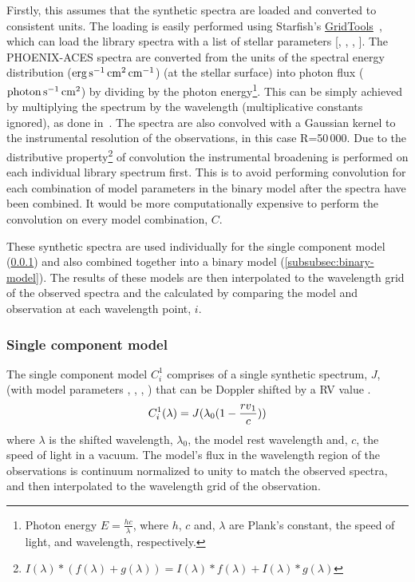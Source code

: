 Firstly, this assumes that the synthetic spectra are loaded and converted to consistent units.
The loading is easily performed using Starfish's \href{https://iancze.github.io/Starfish/current/grid_tools.html}{GridTools}~\citep{czekala_constructing_2015}, which can load the library spectra with a list of stellar parameters [\Teff{}, \Logg{}, \feh{}, \alphafe{}].
The {PHOENIX-ACES} spectra are converted from the units of the spectral energy distribution (\(\rm erg\,s^{-1}\,cm^{2}\,cm^{-1}\)) (at the stellar surface) into photon flux (\(\rm photon\,s^{-1}\,cm^{2}\)) by dividing by the photon energy\footnote{Photon energy \(E=\frac{hc}{\lambda}\), where \(h\), \(c\) and, \(\lambda\) are Plank's constant, the speed of light, and wavelength, respectively.}.
This can be simply achieved by multiplying the spectrum by the wavelength (multiplicative constants ignored), as done in~\citet{figueira_radial_2016}.
The spectra are also convolved with a Gaussian kernel to the instrumental resolution of the observations, in this case R=50\,000.
Due to the distributive property\footnote{\(I(\lambda) \ast (f(\lambda) + g(\lambda)) = I(\lambda) \ast f(\lambda) + I(\lambda) \ast g(\lambda) \)} of convolution the instrumental broadening is performed on each individual library spectrum first.
This is to avoid performing convolution for each combination of model parameters in the binary model after the spectra have been combined.
It would be more computationally expensive to perform the convolution on every model combination, \(C\).

These synthetic spectra are used individually for the single component model (\cref{subsubsec:single-model}) and also combined together into a binary model (\cref{subsubsec:binary-model}).
The results of these models are then interpolated to the wavelength grid of the observed spectra and the \textchisquared{} calculated by comparing the model and observation at each wavelength point, \(i\).

\subsubsection{Single component model}
\label{subsubsec:single-model}
The single component model \(C^{1}_{i}\) comprises of a single synthetic spectrum, \(J\), (with model parameters \Teff{}, \Logg{}, \feh{}, \alphafe{}) \alphafe{} that can be Doppler shifted by a {RV} value \Rvone{}.
\begin{equation}
C^{1}_{i}(\lambda) = J{}(\lambda_{0}(1-\frac{{rv{}}_{1}}{c}))
\end{equation}
where \(\lambda\) is the shifted wavelength, \(\lambda_{0}\), the model rest wavelength and, \(c\), the speed of light in a vacuum.
The model's flux in the wavelength region of the observations is continuum normalized to unity to match the observed spectra, and then interpolated to the wavelength grid of the observation.

